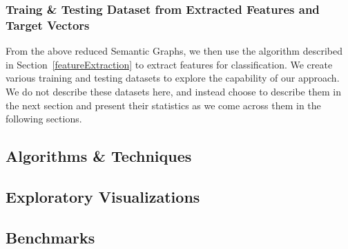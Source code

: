 \documentclass[runningheads,a4paper]{llncs}
\begin{document}
\subsubsection{Traing \& Testing Dataset from Extracted Features and Target Vectors}
From the above reduced Semantic Graphs, we then use the algorithm described in Section~\ref{featureExtraction} to extract features for classification. We create various training and testing datasets to explore the capability of our approach. We do not describe these datasets here, and instead choose to describe them in the next section and present their statistics as we come across them in the following sections.  

\subsection{Algorithms \& Techniques}

\subsection{Exploratory Visualizations}

\subsection{Benchmarks}



\end{document}
